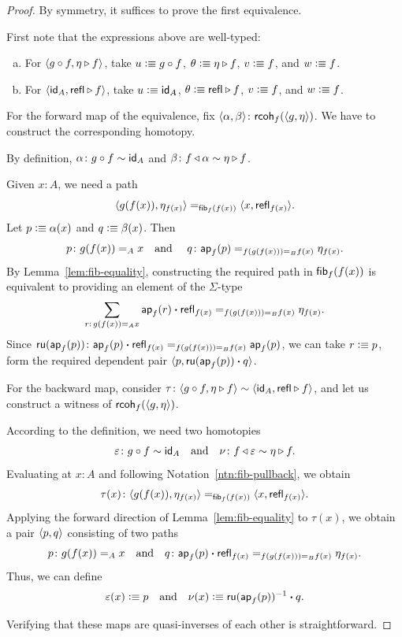 \begin{proof}
    By symmetry, it suffices to prove the first equivalence.

    First note that the expressions above are well-typed:
    \begin{enumerate}[a),font=\upshape]
        \item For $\langle g\circ f,\eta\triangleright f\rangle$, take $u\mathrel{\vcentcolon}\equiv g\circ f$, $\theta\mathrel{\vcentcolon}\equiv\eta\triangleright f$, $v\mathrel{\vcentcolon}\equiv f$, and $w\mathrel{\vcentcolon}\equiv f$.
        
        \item For $\langle\mathsf{id}_A,\mathsf{refl}\triangleright f\rangle$, take $u\mathrel{\vcentcolon}\equiv\mathsf{id}_A$, $\theta\mathrel{\vcentcolon}\equiv\mathsf{refl}\triangleright f$, $v\mathrel{\vcentcolon}\equiv f$, and $w\mathrel{\vcentcolon}\equiv f$.
    \end{enumerate}
    
    For the forward map of the equivalence, fix $\dep{\alpha,\beta}\colon\fun{rcoh}_f(\dep{g,\eta})$. We have to construct the corresponding homotopy.

    By definition, $\alpha\colon g\circ f\sim\id_A$ and $\beta\colon f\lwct\alpha\sim\eta\rwct f$.
    
    Given $x\colon A$, we need a path
    \[
        \langle g(f(x)),\eta_{f(x)}\rangle
            \mathrel{=_{\mathsf{fib}_f(f(x))}}
            \langle x,\mathsf{refl}_{f(x)}\rangle.
    \]
    Let $p\mathrel{\vcentcolon}\equiv\alpha(x)$ and $q\mathrel{\vcentcolon}\equiv\beta(x)$. Then 
    \[
        p\colon g(f(x))\eq Ax
        \quad\text{and }\quad
        q\colon\fun{ap}_f(p)
            \eq{f(g(f(x)))\eq Bf(x)}\eta_{f(x)}.
    \]
    By Lemma~\ref{lem:fib-equality}, constructing the required path in $\mathsf{fib}_f(f(x))$ is equivalent to providing an element of the $\Sigma$-type
    \[
        \sum_{r\colon g(f(x))\eq Ax}
            \fun{ap}_f(r)\ct\fun{refl}_{f(x)}
            \eq{f(g(f(x)))\eq Bf(x)}
            \eta_{f(x)}.
    \]
    Since $\fun{ru}(\fun{ap}_f(p))\colon\fun{ap}_f(p)\ct\fun{refl}_{f(x)}\eq{f(g(f(x)))\eq Bf(x)}\fun{ap}_f(p)$, we can take $r\mathrel{\vcentcolon}\equiv p$, form the required dependent pair $\langle p,\mathsf{ru}(\mathsf{ap}_f(p))\mathbin{\boldsymbol{\cdot}} q\rangle$.

    For the backward map, consider $\tau\colon\dep{g\circ f,\eta\rwct f}\sim\dep{\id_A,\fun{refl}\rwct f}$, and let us construct a witness of $\mathsf{rcoh}_f(\langle g,\eta\rangle)$.

    According to the definition, we need two homotopies 
    \[
        \varepsilon\colon g\circ f\sim\id_A
        \quad\text{and}\quad
        \nu\colon f\lwct\varepsilon\sim\eta\rwct f.
    \]
    Evaluating at $x\colon A$ and following Notation~\ref{ntn:fib-pullback}, we obtain
    \[
        \tau(x)\colon\dep{g(f(x)),\eta_{f(x)}}
            \eq{\fun{fib}_f(f(x))}
            \dep{x,\fun{refl}_{f(x)}}.
    \]
    Applying the forward direction of Lemma~\ref{lem:fib-equality} to $\tau(x)$, we obtain a pair $\langle p,q\rangle$ consisting of two paths
    \[
        p\colon g(f(x))\eq Ax
        \quad\text{and}\quad
        q\colon\fun{ap}_f(p)\ct\fun{refl}_{f(x)}
        \eq{f(g(f(x)))\eq Bf(x)}\eta_{f(x)}.
    \]
    Thus, we can define
    \[
        \varepsilon(x)\mathrel{\vcentcolon}\equiv p
        \quad\text{and}\quad
        \nu(x)\mathrel{\vcentcolon}\equiv\mathsf{ru}(\mathsf{ap}_f(p))^{-1}\mathbin{\boldsymbol{\cdot}} q.
    \]

    Verifying that these maps are quasi-inverses of each other is straightforward.
\end{proof}

